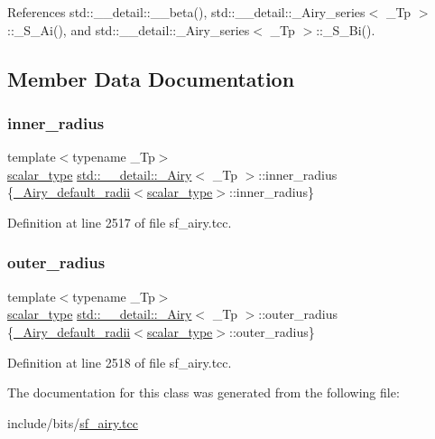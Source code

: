 References std\+::\+\_\+\+\_\+detail\+::\+\_\+\+\_\+beta(), std\+::\+\_\+\+\_\+detail\+::\+\_\+\+Airy\+\_\+series$<$ \+\_\+\+Tp $>$\+::\+\_\+\+S\+\_\+\+Ai(), and std\+::\+\_\+\+\_\+detail\+::\+\_\+\+Airy\+\_\+series$<$ \+\_\+\+Tp $>$\+::\+\_\+\+S\+\_\+\+Bi().



\subsection{Member Data Documentation}
\mbox{\label{classstd_1_1____detail_1_1__Airy_ae619970f4c54b7f80340f05b7ead83e1}} 
\subsubsection{\texorpdfstring{inner\+\_\+radius}{inner\_radius}}
{\footnotesize\ttfamily template$<$typename \+\_\+\+Tp$>$ \\
\hyperlink{classstd_1_1____detail_1_1__Airy_a4b2b920ead7adcf08d49420c24e491b5}{scalar\+\_\+type} \hyperlink{classstd_1_1____detail_1_1__Airy}{std\+::\+\_\+\+\_\+detail\+::\+\_\+\+Airy}$<$ \+\_\+\+Tp $>$\+::inner\+\_\+radius \{\hyperlink{structstd_1_1____detail_1_1__Airy__default__radii}{\+\_\+\+Airy\+\_\+default\+\_\+radii}$<$\hyperlink{classstd_1_1____detail_1_1__Airy_a4b2b920ead7adcf08d49420c24e491b5}{scalar\+\_\+type}$>$\+::inner\+\_\+radius\}}



Definition at line 2517 of file sf\+\_\+airy.\+tcc.

\mbox{\label{classstd_1_1____detail_1_1__Airy_af688e5d14ed305f95f0e9d9d58d3bf9a}} 
\subsubsection{\texorpdfstring{outer\+\_\+radius}{outer\_radius}}
{\footnotesize\ttfamily template$<$typename \+\_\+\+Tp$>$ \\
\hyperlink{classstd_1_1____detail_1_1__Airy_a4b2b920ead7adcf08d49420c24e491b5}{scalar\+\_\+type} \hyperlink{classstd_1_1____detail_1_1__Airy}{std\+::\+\_\+\+\_\+detail\+::\+\_\+\+Airy}$<$ \+\_\+\+Tp $>$\+::outer\+\_\+radius \{\hyperlink{structstd_1_1____detail_1_1__Airy__default__radii}{\+\_\+\+Airy\+\_\+default\+\_\+radii}$<$\hyperlink{classstd_1_1____detail_1_1__Airy_a4b2b920ead7adcf08d49420c24e491b5}{scalar\+\_\+type}$>$\+::outer\+\_\+radius\}}



Definition at line 2518 of file sf\+\_\+airy.\+tcc.



The documentation for this class was generated from the following file\+:\begin{DoxyCompactItemize}
\item 
include/bits/\hyperlink{sf__airy_8tcc}{sf\+\_\+airy.\+tcc}\end{DoxyCompactItemize}
